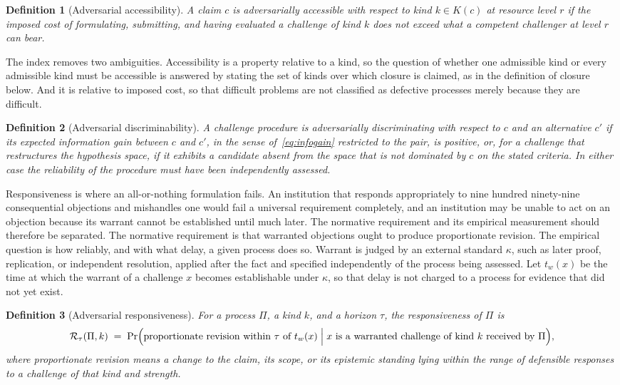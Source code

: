 \documentclass[11pt]{article}
\newtheorem{definition}{Definition}
\theoremstyle{remark}
\begin{document}
\begin{definition}[Adversarial accessibility]
A claim $c$ is adversarially accessible with respect to kind $k\in K(c)$ at resource level $r$ if the imposed cost of formulating, submitting, and having evaluated a challenge of kind $k$ does not exceed what a competent challenger at level $r$ can bear.
\end{definition}

The index removes two ambiguities. Accessibility is a property relative to a kind, so the question of whether one admissible kind or every admissible kind must be accessible is answered by stating the set of kinds over which closure is claimed, as in the definition of closure below. And it is relative to imposed cost, so that difficult problems are not classified as defective processes merely because they are difficult.

\begin{definition}[Adversarial discriminability]
A challenge procedure is adversarially discriminating with respect to $c$ and an alternative $c'$ if its expected information gain between $c$ and $c'$, in the sense of~\eqref{eq:infogain} restricted to the pair, is positive, or, for a challenge that restructures the hypothesis space, if it exhibits a candidate absent from the space that is not dominated by $c$ on the stated criteria. In either case the reliability of the procedure must have been independently assessed.
\end{definition}

Responsiveness is where an all-or-nothing formulation fails. An institution that responds appropriately to nine hundred ninety-nine consequential objections and mishandles one would fail a universal requirement completely, and an institution may be unable to act on an objection because its warrant cannot be established until much later. The normative requirement and its empirical measurement should therefore be separated. The normative requirement is that warranted objections ought to produce proportionate revision. The empirical question is how reliably, and with what delay, a given process does so. Warrant is judged by an external standard $\kappa$, such as later proof, replication, or independent resolution, applied after the fact and specified independently of the process being assessed. Let $t_w(x)$ be the time at which the warrant of a challenge $x$ becomes establishable under $\kappa$, so that delay is not charged to a process for evidence that did not yet exist.

\begin{definition}[Adversarial responsiveness]
For a process $\Pi$, a kind $k$, and a horizon $\tau$, the responsiveness of $\Pi$ is
\begin{equation}
\mathcal R_\tau(\Pi,k)\;=\;\Pr\Bigl(\text{proportionate revision within }\tau\text{ of }t_w(x)\;\Big|\;x\text{ is a warranted challenge of kind }k\text{ received by }\Pi\Bigr),
\label{eq:resp}
\end{equation}
where proportionate revision means a change to the claim, its scope, or its epistemic standing lying within the range of defensible responses to a challenge of that kind and strength.
\end{definition}
\end{document}
